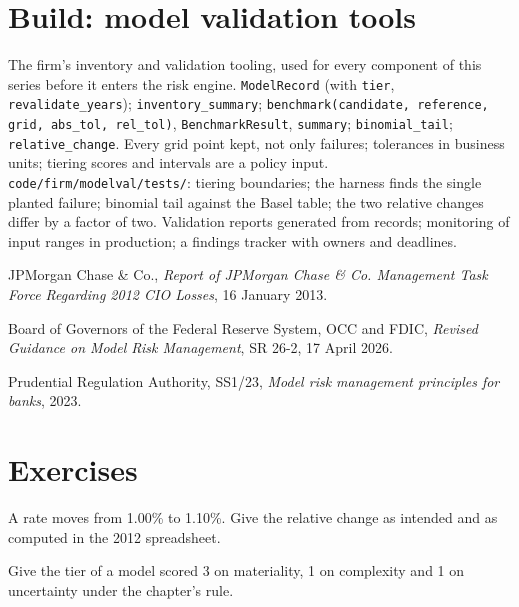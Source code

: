 \section{Build: model validation tools}\label{bld:rc:model-risk-and-validation:modelval}

\begin{build}
 The firm's inventory and validation tooling, used for every component of this series
before it enters the risk engine.
 \texttt{ModelRecord} (with \texttt{tier}, \texttt{revalidate\_years});
\texttt{inventory\_summary}; \texttt{benchmark(candidate, reference, grid, abs\_tol, rel\_tol)},
\texttt{BenchmarkResult}, \texttt{summary}; \texttt{binomial\_tail}; \texttt{relative\_change}.
 Every grid point kept, not only failures; tolerances in business units; tiering scores and
intervals are a policy input.
 \texttt{code/firm/modelval/tests/}: tiering boundaries; the harness finds the
single planted failure; binomial tail against the Basel table; the two relative changes differ by a factor
of two.
 Validation reports generated from records; monitoring of input ranges in production;
a findings tracker with owners and deadlines.
\end{build}

\begin{omsources}
\item JPMorgan Chase \& Co., \emph{Report of JPMorgan Chase \& Co. Management Task Force Regarding 2012
CIO Losses}, 16 January 2013.
\item Board of Governors of the Federal Reserve System, OCC and FDIC, \emph{Revised Guidance on Model
Risk Management}, SR 26-2, 17 April 2026.
\item Prudential Regulation Authority, SS1/23, \emph{Model risk management principles for banks}, 2023.
\end{omsources}

\section{Exercises}

\begin{exercise}[$\star$]\label{exo:rc:model-risk-and-validation:1}
A rate moves from 1.00\% to 1.10\%. Give the relative change as intended and as computed in the
2012 spreadsheet.
\end{exercise}

\begin{exercise}[$\star$]\label{exo:rc:model-risk-and-validation:2}
Give the tier of a model scored 3 on materiality, 1 on complexity and 1 on uncertainty under the
chapter's rule.
\end{exercise}

